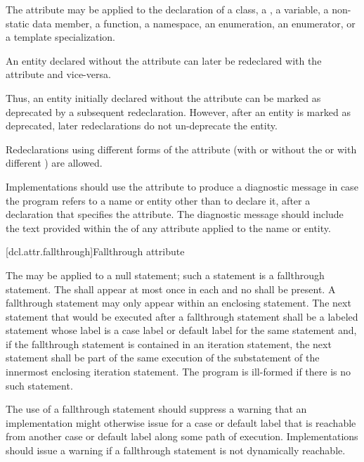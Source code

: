 \pnum
The attribute may be applied to the declaration of
a class,
a ,
a variable,
a non-static data member,
a function,
a namespace,
an enumeration,
an enumerator, or
a template specialization.

\pnum
An entity declared without the  attribute can later be redeclared
with the attribute and vice-versa.
\begin{note}
Thus, an entity initially declared without the
attribute can be marked as deprecated by a subsequent redeclaration. However, after an entity
is marked as deprecated, later redeclarations do not un-deprecate the entity.
\end{note}
Redeclarations using different forms of the attribute (with or without the
 or with different
) are allowed.

\pnum
\recommended
Implementations should use the  attribute to produce a diagnostic
message in case the program refers to a name or entity other than to declare it, after a
declaration that specifies the attribute. The diagnostic message should include the text provided
within the  of any  attribute applied
to the name or entity.

[dcl.attr.fallthrough]{Fallthrough attribute}

\pnum
The  
may be applied to a null statement;
such a statement is a fallthrough statement.
The  
shall appear at most once in each  and
no  shall be present.
A fallthrough statement may only appear within
an enclosing  statement.
The next statement that would be executed after a fallthrough statement
shall be a labeled statement whose label is a case label or
default label for the same  statement and,
if the fallthrough statement is contained in an iteration statement,
the next statement shall be part of the same execution of
the substatement of the innermost enclosing iteration statement.
The program is ill-formed if there is no such statement.

\pnum
\recommended
The use of a fallthrough statement should suppress
a warning that an implementation might otherwise issue
for a case or default label that is reachable
from another case or default label along some path of execution.
Implementations should issue a warning
if a fallthrough statement is not dynamically reachable.

